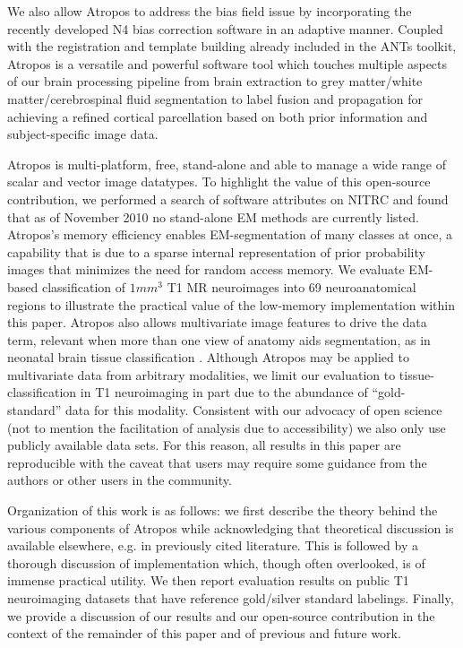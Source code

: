 \documentclass[11pt,english]{article}
\begin{document}
We also allow Atropos to address the bias field issue by incorporating
the recently developed N4 bias correction software \citep{Tustison2010} in an adaptive manner.  Coupled with the
registration \citep{Avants2010b} and template building 
\citep{Avants2010} already included in the ANTs toolkit, Atropos is a
versatile and powerful software tool which touches multiple aspects of
our brain processing pipeline from brain extraction
\citep{Avants2010a} to grey matter/white matter/cerebrospinal fluid
segmentation to label fusion and propagation for achieving a refined
cortical parcellation based on both prior information and
subject-specific image data.

Atropos is multi-platform, free, stand-alone and able to
manage a wide range of scalar and vector image datatypes.  To highlight the
value of this open-source contribution, we performed a search of
software attributes on NITRC and found that as of November 2010 no
stand-alone EM methods are currently listed.
Atropos's memory efficiency enables EM-segmentation of many classes at
once, a capability that is due to a sparse internal representation of
prior probability images that minimizes the need for random access
memory.  We evaluate EM-based classification of $1 mm^3$ T1 MR
neuroimages into 69 neuroanatomical regions to illustrate the practical
value of the low-memory implementation within this paper.  Atropos
also allows multivariate image features to drive the data term, relevant when more than one view of anatomy aids
segmentation, as in neonatal brain tissue classification
\cite{Weisenfeld2009}.  Although Atropos may be applied to
multivariate data from arbitrary modalities, we limit our evaluation
to tissue-classification in T1 neuroimaging in part due to the
abundance of ``gold-standard'' data for this modality.  Consistent
with our advocacy of open science (not to mention the facilitation of
analysis due to accessibility) we also only use publicly available
data sets.  For this reason, all results in this paper are
reproducible with the caveat that users may require some guidance from
the authors or other users in the community.

Organization of this work is as follows: we first describe the theory
behind the various components of Atropos while
acknowledging that theoretical discussion is available elsewhere,
e.g. in previously cited literature.  This is followed by a thorough
discussion of implementation which, though often overlooked, is of
immense practical utility.  We then report evaluation results on
public T1 neuroimaging datasets that have reference gold/silver
standard labelings.  Finally, we provide a discussion of our results
and our open-source contribution in the context of the remainder of
this paper and of previous and future work.
\end{document}
